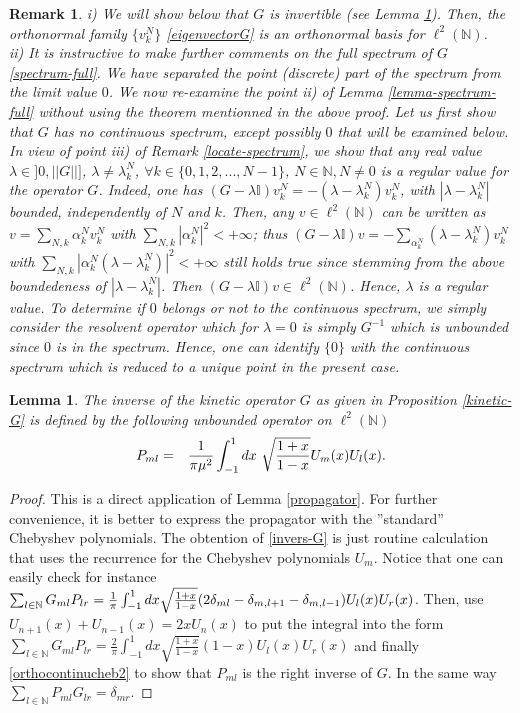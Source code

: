 \documentclass[a4paper]{jpconf}
\numberwithin{equation}{section}
\newcommand\bbone{{ \mathbb{I}}}
\newtheorem{lemma}[Theorem]{Lemma}
\newtheorem{remark}[Theorem]{Remark}
\theoremstyle{nonumberplain}
\newtheorem{proof}{Proof}
\begin{document}
\begin{remark}
i) We will show below that $G$ is invertible (see Lemma \ref{propagator-spectform}). Then, the orthonormal family $\{v^N_k \}$ \eqref{eigenvectorG} is an orthonormal basis for $\ell^2(\mathbb{N})$. \\
ii) It is instructive to make further comments on the full spectrum of $G$ \eqref{spectrum-full}. We have separated the point (discrete) part of the spectrum from the limit value $0$. We now re-examine the point ii) of Lemma \ref{lemma-spectrum-full} without using the theorem mentionned in the above proof. Let us first show that $G$ has no continuous spectrum, except possibly $0$ that will be examined below. In view of point iii) of Remark \ref{locate-spectrum}, we show that any real value $\lambda\in]0,||G||]$, $\lambda\ne\lambda^N_k$, $\forall k\in\{0,1,2,...,N-1 \}$, $N\in\mathbb{N}, N\ne0$ is a regular value for the operator $G$. Indeed, one has $(G-\lambda\bbone)v^N_k=-(\lambda-\lambda^N_k)v^N_k$, with $|\lambda-\lambda^N_k|$ bounded, independently of $N$ and $k$. Then, any $v\in\ell^2(\mathbb{N})$ can be written as $v=\sum_{N,k}\alpha^N_kv^N_k$ with $\sum_{N,k}|\alpha^N_k|^2<+\infty$; thus $(G-\lambda\bbone)v=-\sum_{\alpha^N_k}(\lambda-\lambda^N_k)v^N_k$ with $\sum_{N,k}|\alpha^N_k(\lambda-\lambda^N_k)
|^2<+\infty$ still holds true since stemming from the above boundedeness of $|\lambda-\lambda^N_k|$. Then $(G-\lambda\bbone)v\in\ell^2(\mathbb{N})$. Hence, $\lambda$ is a regular value. To determine if $0$ belongs or not to the continuous spectrum, we simply consider the resolvent operator which for $\lambda=0$ is simply $G^{-1}$ which is unbounded since $0$ is in the spectrum. Hence, one can identify $\{0\}$ with the continuous spectrum which is reduced to a unique point in the present case.
\end{remark}
\begin{lemma}\label{propagator-spectform}
The inverse of the kinetic operator $G$ as given in Proposition \ref{kinetic-G} is defined by the following unbounded operator on $\ell^2(\mathbb{N})$
\begin{eqnarray}
P_{ml}&=&{{1}\over{\pi\mu^2}}\int_{-1}^1dx\ {\sqrt{{{1+x }\over{ 1-x}}}}U_m(x)U_l(x)\label{invers-G}.
\end{eqnarray}
\end{lemma}
\begin{proof}
This is a direct application of Lemma \ref{propagator}. For further convenience, it is better to express the propagator with the ''standard'' Chebyshev polynomials. The obtention of \eqref{invers-G} is just routine calculation that uses the recurrence for the Chebyshev polynomials $U_m$. Notice that one can easily check for instance $\sum_{l\in\mathbb{N}}G_{ml}P_{lr}={{1}\over{\pi}}\int_{-1}^1dx{\sqrt{\frac{1+x}{1-x}}}(2\delta_{ml}-\delta_{m,l+1}-\delta_{m,l-1})U_l(x)U_r(x)$. Then, use $U_{n+1}(x)+U_{n-1}(x)=2xU_n(x)$ to put the integral into the form $\sum_{l\in\mathbb{N}}G_{ml}P_{lr}=\frac{2}{\pi}\int_{-1}^1dx{\sqrt{\frac{1+x}{1-x}}}(1-x)U_l(x)U_r(x)$ and finally \eqref{orthocontinucheb2} to show that $P_{ml}$ is the right inverse of $G$. In the same way $\sum_{l\in\mathbb{N}}P_{ml}G_{lr}=\delta_{mr}$.
\end{proof}
\end{document}
